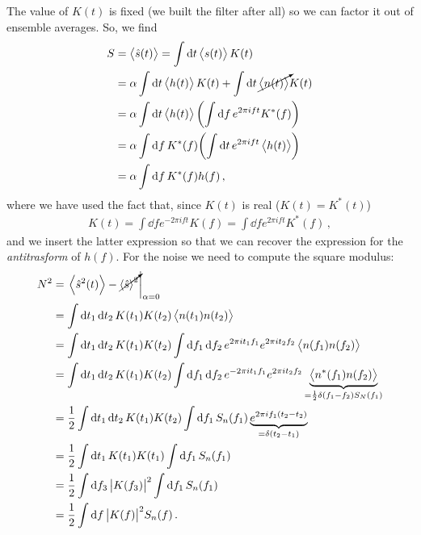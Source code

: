 \documentclass[main.tex]{subfiles}
\begin{document}
The value of \(K(t)\) is fixed (we built the filter after all) so we can factor it out of ensemble averages. So, we find 
%
\begin{align}
S 
&= \expval{\hat{s}(t)}  = \int \dd{t} \expval{s(t)} K(t)  \\
&= \alpha \int \dd{t} \expval{h(t)} K(t) + \int \dd{t} \cancelto{}{\expval{n(t)}} K(t) \\
&= \alpha \int \dd{t} \expval{h(t)} \qty( \int \dd{f} e^{2 \pi i ft} K^{*}(f)) \\
&= \alpha \int \dd{f} K^{*} (f) \qty(\int \dd{t} e^{2 \pi i ft} \expval{h(t)}) \\
&= \alpha \int \dd{f} K^{*}(f) h(f)
\,,
\end{align}
%
where we have used the fact that, since \(K(t)\) is real (\(K(t) = K^{*}(t)\))
%
\begin{align}
K(t) 
= \int \dd{f} e^{-2 \pi i ft} K(f)
= \int \dd{f} e^{2 \pi i ft} K^{*}(f)
\,,
\end{align}
%
and we insert the latter expression so that we can recover the expression for the \emph{antitrasform} of \(h(f)\).
For the noise we need to compute the square modulus:
%
\begin{align}
N^2 &= \eval{\expval{\hat{s}^2(t)} - \cancelto{}{\expval{\hat{s}}^2}}_{\alpha = 0 } \\
&= \int \dd{t_1 } \dd{t_2 } K(t_1) K(t_2) \expval{n(t_1 ) n(t_2 )}  \\
&= \int \dd{t_1 } \dd{t_2 } K(t_1) K(t_2)
\int \dd{f_1 } \dd{f_2 } e^{2 \pi i t_1 f_1 } e^{2 \pi i t_2 f_2 } \expval{n(f_1 ) n(f_2 )}  \\
&= \int \dd{t_1 } \dd{t_2 } K(t_1) K(t_2)
\int \dd{f_1 } \dd{f_2 } e^{-2 \pi i t_1 f_1 } e^{2 \pi i t_2 f_2 } \underbrace{\expval{n^{*}(f_1 ) n(f_2 )}}_{= \frac{1}{2} \delta (f_1 - f_2) S_N(f_1 )} \\
&= \frac{1}{2} \int \dd{t_1 } \dd{t_2 } K(t_1) K(t_2) 
\int \dd{f_1 } S_n(f_1 ) \underbrace{e^{2 \pi i f_1 (t_2 - t_2 )}}_{= \delta (t_2 - t_1 )} \\
&= \frac{1}{2} \int \dd{t_1 } K(t_1 )K(t_1 ) \int \dd{f_1 } S_n(f_1 ) \\
&= \frac{1}{2} \int \dd{f_3 } \abs{K(f_3 )}^2 \int \dd{f_1 } S_n (f_1 ) \\
&= \frac{1}{2} \int \dd{f} \abs{K(f)}^2 S_n(f)
\,.
\end{align}

\end{document}
